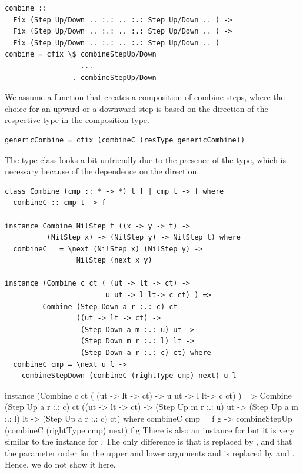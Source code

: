 \documentclass{llncs}
\begin{document}
\begin{small}
\begin{verbatim}
combine :: 
  Fix (Step Up/Down .. :.: .. :.: Step Up/Down .. ) ->
  Fix (Step Up/Down .. :.: .. :.: Step Up/Down .. ) ->
  Fix (Step Up/Down .. :.: .. :.: Step Up/Down .. )
combine = cfix \$ combineStepUp/Down 
                  ...
                . combineStepUp/Down 
\end{verbatim}%
\end{small}

We assume a function that creates a composition of  combine steps, where the choice for an upward or a downward step is based on the direction of the respective  type in the composition type.


\begin{small}
\begin{verbatim}
genericCombine = cfix (combineC (resType genericCombine))
\end{verbatim}%
\end{small}

The type class looks a bit unfriendly due to the presence of the  type, which is necessary because of the dependence on the direction.

\begin{small}
\begin{verbatim}
class Combine (cmp :: * -> *) t f | cmp t -> f where
  combineC :: cmp t -> f

instance Combine NilStep t ((x -> y -> t) -> 
          (NilStep x) -> (NilStep y) -> NilStep t) where
  combineC _ = \next (NilStep x) (NilStep y) ->
                 NilStep (next x y) 
 
instance (Combine c ct ( (ut -> lt -> ct) ->
                        u ut -> l lt-> c ct) ) =>
         Combine (Step Down a r :.: c) ct
                 ((ut -> lt -> ct) ->
                  (Step Down a m :.: u) ut -> 
                  (Step Down m r :.: l) lt -> 
                  (Step Down a r :.: c) ct) where
  combineC cmp = \next u l ->
    combineStepDown (combineC (rightType cmp) next) u l
\end{verbatim}
\end{small}

\bc
instance (Combine c ct ( (ut -> lt -> ct) ->
                        u ut -> l lt-> c ct) ) =>
         Combine (Step Up a r :.: c) ct
                 ((ut -> lt -> ct) -> 
                  (Step Up m r :.: u) ut -> 
                  (Step Up a m :.: l) lt -> 
                  (Step Up a r :.: c) ct) where
  combineC cmp = \next f g ->
    combineStepUp (combineC (rightType cmp) next) f g
\ec
There is also an instance for  but it is very similar to the instance for . The only difference is that  is replaced by , and that the parameter order for the upper and lower arguments   and  is replaced by  and . Hence, we do not show it here.
\end{document}
